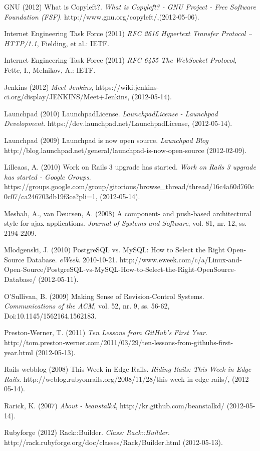 \begin{flushleft}
GNU (2012) What is Copyleft?. \emph{What is Copyleft? - GNU Project - Free Software Foundation (FSF)}. http://www.gnu.org/copyleft/,(2012-05-06).

Internet Engineering Task Force (2011) \emph{RFC 2616 Hypertext Transfer Protocol -- HTTP/1.1}, Fielding, et al.: IETF.

Internet Engineering Task Force (2011) \emph{RFC 6455 The WebSocket Protocol}, Fette, I., Melnikov, A.: IETF.

Jenkins (2012) \emph{Meet Jenkins}, https://wiki.jenkins-ci.org/display/JENKINS/Meet+Jenkins, (2012-05-14).

Launchpad (2010) LaunchpadLicense. \emph{LaunchpadLicense - Launchpad Development}. https://dev.launchpad.net/LaunchpadLicense, (2012-05-14).

Launchpad (2009) Launchpad is now open source. \emph{Launchpad Blog} http://blog.launchpad.net/general/launchpad-is-now-open-source (2012-02-09).

Lilleaas, A. (2010) Work on Rails 3 upgrade has started. \emph{Work on Rails 3 upgrade has started - Google Groups}. https://groups.google.com/group/gitorious/browse\_thread/thread/16c4a60d760c0c07/ca246703db19f3ce?pli=1, (2012-05-14).

Mesbah, A., van Deursen, A. (2008) A component- and push-based architectural style for ajax applications. \emph{Journal of Systems and Software}, vol. 81, nr. 12, ss. 2194-2209.

Mlodgenski, J. (2010) PostgreSQL vs. MySQL: How to Select the Right Open-Source Database. \emph{eWeek}. 2010-10-21.  http://www.eweek.com/c/a/Linux-and-Open-Source/PostgreSQL-vs-MySQL-How-to-Select-the-Right-OpenSource-Database/ (2012-05-11).

O'Sullivan, B. (2009) Making Sense of Revision-Control Systems. \emph{Communications of the ACM}, vol. 52, nr. 9, ss. 56-62, Doi:10.1145/1562164.1562183.

Preston-Werner, T. (2011) \emph{Ten Lessons from GitHub's First Year}. http://tom.preston-werner.com/2011/03/29/ten-lessons-from-githubs-first-year.html (2012-05-13).

Rails webblog (2008) This Week in Edge Rails. \emph{Riding Rails: This Week in Edge Rails}. http://weblog.rubyonrails.org/2008/11/28/this-week-in-edge-rails/, (2012-05-14).

Rarick, K. (2007) \emph{About - beanstalkd}, http://kr.github.com/beanstalkd/ (2012-05-14).

Rubyforge (2012) Rack::Builder. \emph{Class: Rack::Builder}. http://rack.rubyforge.org/doc/classes/Rack/Builder.html (2012-05-13).


\end{flushleft}
